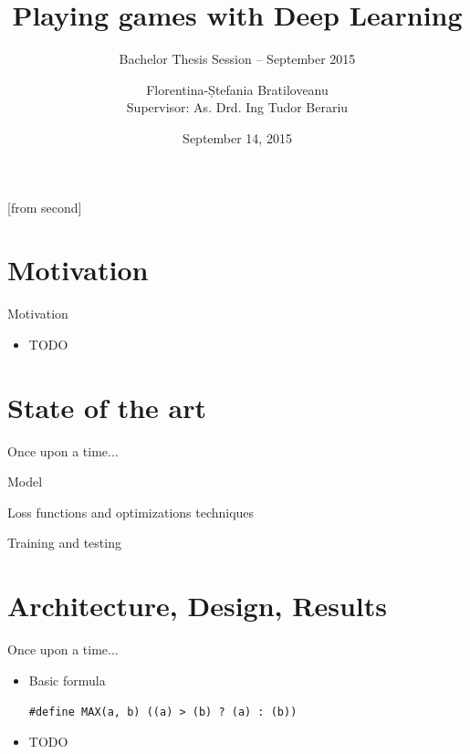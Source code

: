 \documentclass{beamer}
\title[Playing games with Deep Learning]{Playing games with Deep Learning}
\subtitle{Bachelor Thesis Session -- September 2015}
\institute{Faculty of Automatic Control and Computers,\\
	University POLITEHNICA of Bucharest}
\author[Florentina-Ștefania Bratiloveanu]{Florentina-Ștefania Bratiloveanu\\
	Supervisor: As. Drd. Ing Tudor Berariu}
\date{September 14, 2015}
\begin{document}
[from second]

\frame{\titlepage}

\frame{\tableofcontents}

\section{Motivation}

\begin{frame}{Motivation}
	\begin{itemize}		%
		\item TODO
	\end{itemize}
\end{frame}

\section{State of the art}
\begin{frame}{Once upon a time...}
\end{frame}
\begin{frame}{Model}
\end{frame}
\begin{frame}{Loss functions and optimizations techniques}
\end{frame}
\begin{frame}{Training and testing}
\end{frame}

\section{Architecture, Design, Results}
\begin{frame}{Once upon a time...}
	\begin{itemize}
		\item Basic formula
			\begin{beamerboxesrounded}[lower=block body,shadow=true]{}
				\texttt{\#define MAX(a, b)   ((a) > (b) ? (a) : (b))}
			\end{beamerboxesrounded}
		\item TODO
	\end{itemize}
\end{frame}
\end{document}
